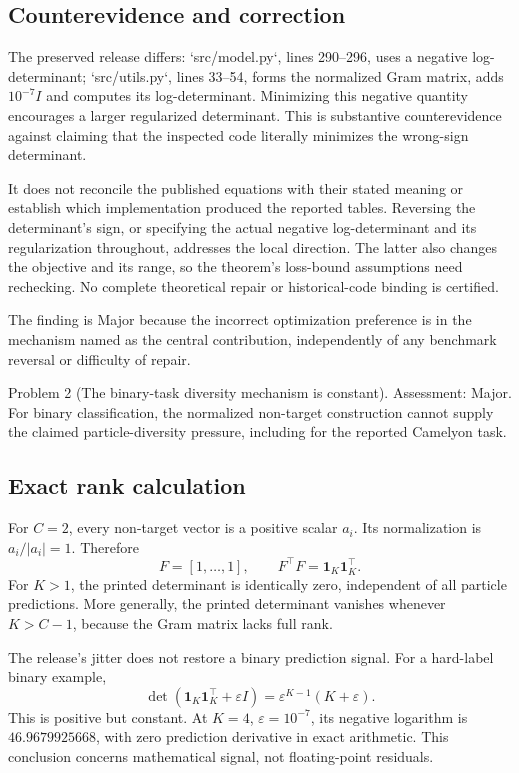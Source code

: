 \documentclass[10pt]{article}
\begin{document}
\subsection*{Counterevidence and correction}
The preserved release differs: `src/model.py`, lines 290–296, uses a negative log-determinant; `src/utils.py`, lines 33–54, forms the normalized Gram matrix, adds \(10^{-7}I\) and computes its log-determinant. Minimizing this negative quantity encourages a larger regularized determinant. This is substantive counterevidence against claiming that the inspected code literally minimizes the wrong-sign determinant.\par
It does not reconcile the published equations with their stated meaning or establish which implementation produced the reported tables. Reversing the determinant’s sign, or specifying the actual negative log-determinant and its regularization throughout, addresses the local direction. The latter also changes the objective and its range, so the theorem’s loss-bound assumptions need rechecking. No complete theoretical repair or historical-code binding is certified.\par
The finding is Major because the incorrect optimization preference is in the mechanism named as the central contribution, independently of any benchmark reversal or difficulty of repair.\par
Problem 2 (The binary-task diversity mechanism is constant).  Assessment: Major. For binary classification, the normalized non-target construction cannot supply the claimed particle-diversity pressure, including for the reported Camelyon task.\par
\subsection*{Exact rank calculation}
For \(C=2\), every non-target vector is a positive scalar \(a_i\). Its normalization is \(a_i/|a_i|=1\). Therefore \[F=[1,\ldots,1],\qquad F^\top F=\mathbf1_K\mathbf1_K^\top.\] For \(K>1\), the printed determinant is identically zero, independent of all particle predictions. More generally, the printed determinant vanishes whenever \(K>C-1\), because the Gram matrix lacks full rank.\par
The release’s jitter does not restore a binary prediction signal. For a hard-label binary example, \[\det(\mathbf1_K\mathbf1_K^\top+\varepsilon I)
 =\varepsilon^{K-1}(K+\varepsilon).\] This is positive but constant. At \(K=4\), \(\varepsilon=10^{-7}\), its negative logarithm is \(46.9679925668\), with zero prediction derivative in exact arithmetic. This conclusion concerns mathematical signal, not floating-point residuals.\par
\end{document}
